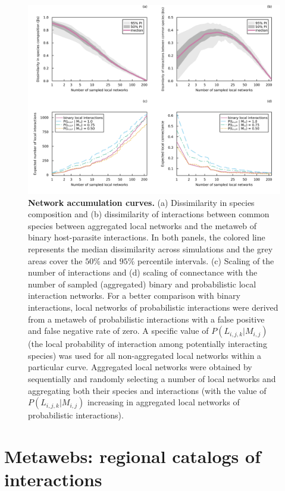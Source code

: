 \begin{figure}[!h]
  \centering
  \includegraphics[width=\textwidth]{figures/article1/network_accumulation.png}
  \caption{\textbf{Network accumulation curves.}
  (a) Dissimilarity in species composition and (b) dissimilarity of interactions
  between common species between aggregated local networks and the metaweb of
  binary host-parasite interactions. In both panels, the colored line represents
  the median dissimilarity across simulations and the grey areas cover the
  $50\%$ and $95\%$ percentile intervals. (c) Scaling of the number of
  interactions and (d) scaling of connectance with the number of sampled
  (aggregated) binary and probabilistic local interaction networks. For a better
  comparison with binary interactions, local networks of probabilistic
  interactions were derived from a metaweb of probabilistic interactions with a
  false positive and false negative rate of zero. A specific value of $P(L_{i,
  j, k}|M_{i, j})$ (the local probability of interaction among potentially
  interacting species) was used for all non-aggregated local networks within a
  particular curve. Aggregated local networks were obtained by sequentially and
  randomly selecting a number of local networks and aggregating both their
  species and interactions (with the value of $P(L_{i, j, k}|M_{i, j})$
  increasing in aggregated local networks of probabilistic interactions).}
  \label{fig:accumulation}
\end{figure}

\clearpage

\section{Metawebs: regional catalogs of interactions}

